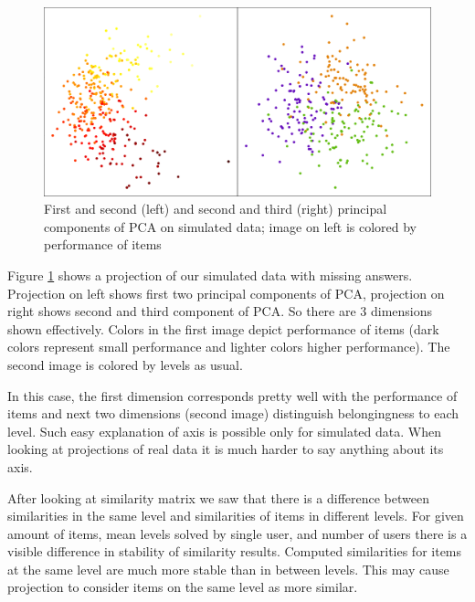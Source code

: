 \documentclass[
  digital, %
  table,   %
  nolof,     %
  nolot,     %
  nocover,
  color,
  final, %
]{fithesis3}
\begin{document}

\begin{figure}
  \includegraphics[width=\textwidth]{img/simulated_missing}
  \caption{First and second (left) and second and third (right) principal components of PCA on simulated data; image on left is colored by performance of items}
  \label{fig:simulated_missing}
\end{figure}

Figure \ref{fig:simulated_missing} shows a projection of our simulated data with missing answers. Projection on left shows first two principal components of PCA, projection on right shows second and third component of PCA. So there are 3 dimensions shown effectively. Colors in the first image depict performance of items (dark colors represent small performance and lighter colors higher performance). The second image is colored by levels as usual.

In this case, the first dimension corresponds pretty well with the performance of items and next two dimensions (second image) distinguish belongingness to each level. Such easy explanation of axis is possible only for simulated data. When looking at projections of real data it is much harder to say anything about its axis.

After looking at similarity matrix we saw that there is a difference between similarities in the same level and similarities of items in different levels. For given amount of items, mean levels solved by single user, and number of users there is a visible difference in stability of similarity results. Computed similarities for items at the same level are much more stable than in between levels. This may cause projection to consider items on the same level as more similar.
\end{document}
